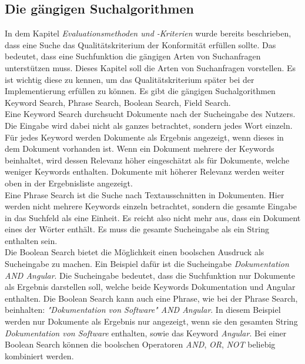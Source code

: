\subsection{Die gängigen Suchalgorithmen}
In dem Kapitel \textit{Evaluationsmethoden und -Kriterien} wurde bereits beschrieben, dass eine Suche das Qualitätskriterium der Konformität erfüllen sollte.
Das bedeutet, dass eine Suchfunktion die gängigen Arten von Suchanfragen unterstützen muss.
Dieses Kapitel soll die Arten von Suchanfragen vorstellen.
Es ist wichtig diese zu kennen, um das Qualitätskriterium später bei der Implementierung erfüllen zu können.
Es gibt die gängigen Suchalgorithmen Keyword Search, Phrase Search, Boolean Search, Field Search.\\

Eine Keyword Search durchsucht Dokumente nach der Sucheingabe des Nutzers.
Die Eingabe wird dabei nicht als ganzes betrachtet, sondern jedes Wort einzeln.
Für jedes Keyword werden Dokumente als Ergebnis angezeigt, wenn dieses in dem Dokument vorhanden ist.
Wenn ein Dokument mehrere der Keywords beinhaltet, wird dessen Relevanz höher eingeschätzt als für Dokumente, welche weniger Keywords enthalten.
Dokumente mit höherer Relevanz werden weiter oben in der Ergebnisliste angezeigt.\\

Eine Phrase Search ist die Suche nach Textausschnitten in Dokumenten.
Hier werden nicht mehrere Keywords einzeln betrachtet, sondern die gesamte Eingabe in das Suchfeld als eine Einheit.
Es reicht also nicht mehr aus, dass ein Dokument eines der Wörter enthält.
Es muss die gesamte Sucheingabe als ein String enthalten sein.\\

Die Boolean Search bietet die Möglichkeit einen boolschen Ausdruck als Sucheingabe zu machen.
Ein Beispiel dafür ist die Sucheingabe \textit{Dokumentation AND Angular}.
Die Sucheingabe bedeutet, dass die Suchfunktion nur Dokumente als Ergebnis darstellen soll, welche beide Keywords Dokumentation und Angular enthalten.
Die Boolean Search kann auch eine Phrase, wie bei der Phrase Search, beinhalten: \textit{"Dokumentation von Software" AND Angular}.
In diesem Beispiel werden nur Dokumente als Ergebnis nur angezeigt, wenn sie den gesamten String \textit{Dokumentation von Software} enthalten, sowie das Keyword \textit{Angular}.
Bei einer Boolean Search können die boolschen Operatoren \textit{AND}, \textit{OR}, \textit{NOT} beliebig kombiniert werden.\\

